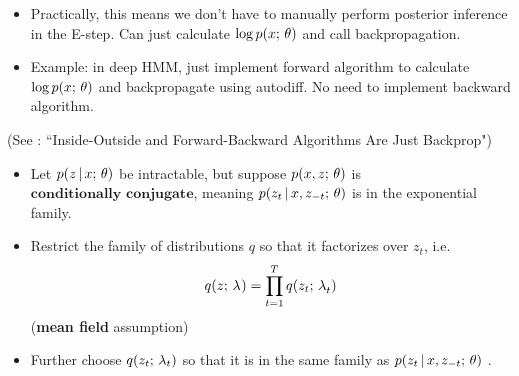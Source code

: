 \begin{frame}
\begin{itemize}
    \item Practically, this means we don't have to manually perform posterior inference in the E-step. Can just calculate $\log p(x ; \, \theta)$ and call backpropagation.
    \item Example: in deep HMM, just implement forward  algorithm to calculate $\log p(x ; \, \theta)$ and backpropagate using autodiff. No need to implement backward algorithm. 
\end{itemize}
    \vspace{2mm}
    (See \cite{eisner2016}:  ``Inside-Outside and Forward-Backward Algorithms Are Just Backprop")
\end{frame}

\begin{frame}

\begin{itemize}
    \item Let $p(z \,|\, x ; \, \theta)$ be intractable, but suppose $p(x, z ; \, \theta)$
is $\textbf{conditionally conjugate}$, meaning $p(z_t \,|\, x, z_{-t} ; \, \theta)$ is in the exponential family.
    \item Restrict the family of distributions $q$ so that it factorizes over $z_t$, i.e.\[ q(z ; \, \lambda^{}) = \prod_{t=1}^T q(z_t ; \, \lambda_{t}^{})\] (\textbf{mean field} assumption)
    \item Further choose $q(z_t ; \, \lambda_{t}) $ so that it is
    in the same family as 
$p(z_t \,|\, x, z_{-t} ; \, \theta)$ .

\end{itemize}

\end{frame}

